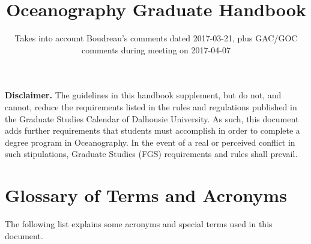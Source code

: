 \documentclass[12pt]{article}
\title{Oceanography Graduate Handbook}
\author{}
\date{Takes into account Boudreau's comments dated 2017-03-21, plus GAC/GOC comments during meeting on 2017-04-07}
\newcommand{\FGS}{FGS\xspace}
\begin{document}
\clearpage
\maketitle
\thispagestyle{empty}

\textbf{Disclaimer.} The guidelines in this handbook supplement, but do not,
and cannot, reduce the requirements listed in the rules and regulations
published in the Graduate Studies Calendar of Dalhousie University.  As such,
this document adds further requirements that students must accomplish in order
to complete a degree program in Oceanography.  In the event of a real or
perceived conflict in such stipulations, Graduate Studies (\FGS) requirements
and rules shall prevail.

\newpage

\renewcommand{\baselinestretch}{0.5}\normalsize

{\footnotesize
\setcounter{tocdepth}{2}
\tableofcontents
}
\thispagestyle{empty}
\renewcommand{\baselinestretch}{1.0}\normalsize

\setcounter{page}{0}

\section{\label{sec:glossary}Glossary of Terms and Acronyms}

The following list explains some acronyms and special terms used in this
document.
\end{document}
